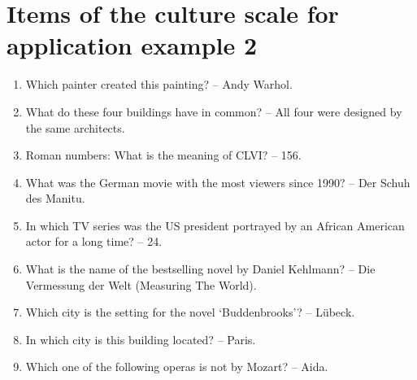 \documentclass[doc,floatsintext,natbib]{apa7}
\begin{document}
%
%


\section{Items of the culture scale for application example 2}
\label{sec:AppendixA}

\begin{enumerate}
\item Which painter created this painting? – Andy Warhol.
\item What do these four buildings have in common? – All four were designed by the same architects.
\item Roman numbers: What is the meaning of CLVI? – 156.
\item What was the German movie with the most viewers since 1990? – Der Schuh des Manitu.
\item In which TV series was the US president portrayed by an African American actor for a long time? – 24.
\item What is the name of the bestselling novel by Daniel Kehlmann? – Die Vermessung der Welt (Measuring The World).
\item Which city is the setting for the novel ‘Buddenbrooks’? – Lübeck.
\item In which city is this building located? – Paris.
\item Which one of the following operas is not by Mozart? – Aida.
\end{enumerate}
\end{document}
